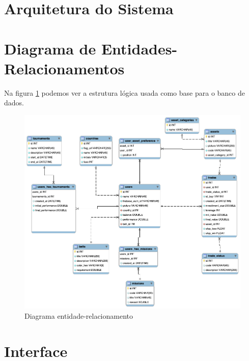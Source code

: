 \section{Arquitetura do Sistema} \label{sec:modelagem:arquitetura}
\section{Diagrama de Entidades-Relacionamentos} \label{sec:modelagem:der}

Na figura \ref{fig:uml_der} podemos ver a estrutura lógica usada como base para o banco de dados.

\begin{figure}[H]
  \caption{\label{fig:uml_der}Diagrama entidade-relacionamento}
  \centering
  \includegraphics[scale=0.5]{imagens/tfc_der.png}
\end{figure}

\section{Interface} \label{sec:modelagem:interface}